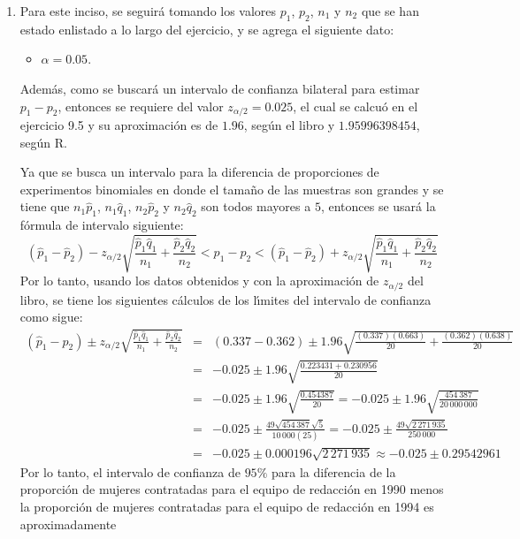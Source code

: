 \begin{solucion}
\begin{enumerate}
  \item Para este inciso, se seguir\'a tomando los valores $p_1$, $p_2$, $n_1$ y $n_2$ que se han estado enlistado a lo largo del ejercicio, y se agrega el siguiente dato:
  \begin{itemize}
   \item $\alpha = 0.05$.
  \end{itemize}
  Adem\'as, como se buscar\'a un intervalo de confianza bilateral para estimar $p_1 - p_2$, entonces se requiere del valor $z_{\alpha/2} = 0.025$, el cual se calcu\'o en el ejercicio 9.5 y su aproximaci\'on es de $1.96$, seg\'un el libro y $1.95996398454$, seg\'un R.
  \par 
  Ya que se busca un intervalo para la diferencia de proporciones de experimentos binomiales en donde el tama\~no de las muestras son grandes y se tiene que $n_1\hat{p}_1$, $n_1\hat{q}_1$, $n_2\hat{p}_2$ y $n_2\hat{q}_2$ son todos mayores a $5$, entonces se usar\'a la f\'ormula de intervalo siguiente:
  \begin{equation*}
   \left( \hat{p}_1 - \hat{p}_2 \right) - z_{\alpha/2}\sqrt{\frac{\hat{p}_1\hat{q}_1}{n_1} + \frac{\hat{p}_2\hat{q}_2}{n_2}} < p_1 - p_2 < \left( \hat{p}_1 - \hat{p}_2 \right) + z_{\alpha/2}\sqrt{\frac{\hat{p}_1\hat{q}_1}{n_1} + \frac{\hat{p}_2\hat{q}_2}{n_2}}
  \end{equation*}
  Por lo tanto, usando los datos obtenidos y con la aproximaci\'on de $z_{\alpha/2}$ del libro, se tiene los siguientes c\'alculos de los l\'{\i}mites del intervalo de confianza como sigue:
  \begin{eqnarray*}
   \left( \hat{p}_1 - \hat{p}_2 \right) \pm z_{\alpha/2}\sqrt{\frac{\hat{p}_1\hat{q}_1}{n_1} + \frac{\hat{p}_2\hat{q}_2}{n_2}} & = & (0.337 - 0.362) \pm 1.96\sqrt{\frac{(0.337)(0.663)}{20} + \frac{(0.362)(0.638)}{20}} \\
   & = & -0.025 \pm 1.96\sqrt{\frac{0.223431 + 0.230956}{20}} \\ 
   & = & -0.025 \pm 1.96\sqrt{\frac{0.454387}{20}} = -0.025 \pm 1.96\sqrt{\frac{454\,387}{20\,000\,000}} \\
   & = & -0.025 \pm \frac{49\sqrt{454\,387}\sqrt{5}}{10\,000(25)} = -0.025 \pm \frac{49\sqrt{2\,271\,935}}{250\,000} \\
   & = & -0.025 \pm 0.000196\sqrt{2\,271\,935} \approx -0.025 \pm 0.29542961
  \end{eqnarray*}
  Por lo tanto, el intervalo de confianza de $95\%$ para la diferencia de la proporci\'on de mujeres contratadas para el equipo de redacci\'on en 1990 menos la proporci\'on de mujeres contratadas para el equipo de redacci\'on en 1994 es aproximadamente

\end{enumerate}
\end{solucion}

